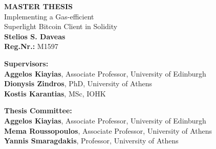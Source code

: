 \begin{center}
\begin{normalsize}
    \vspace{3cm}
    \textbf{MASTER THESIS}\\
    \vspace{3cm}
    Implementing a Gas-efficient\\
    Superlight Bitcoin Client in Solidity\\
    \vspace{3cm}
    \textbf{Stelios S. Daveas}\\
    \textbf{Reg.Nr.:} M1597

    \vspace{5cm}
    \begin{flushleft}
        \textbf{Supervisors:}\\
        \hspace{1.5cm}
        \textbf{Aggelos Kiayias}, Associate Professor, University of Edinburgh\\
        \hspace{1.5cm}
        \textbf{Dionysis Zindros}, PhD, University of Athens\\
        \hspace{1.5cm}
        \textbf{Kostis Karantias}, MSc, IOHK

        \vspace{1cm}

        \textbf{Thesis Committee:}\\
        \hspace{1.5cm}
        \textbf{Aggelos Kiayias}, Associate Professor, University of Edinburgh\\
        \hspace{1.5cm}
        \textbf{Mema Roussopoulos}, Associate Professor, University of Athens\\
        \hspace{1.5cm}
        \textbf{Yannis Smaragdakis}, Professor, University of Athens

    \end{flushleft}
\end{normalsize}
\end{center}
\pagebreak
